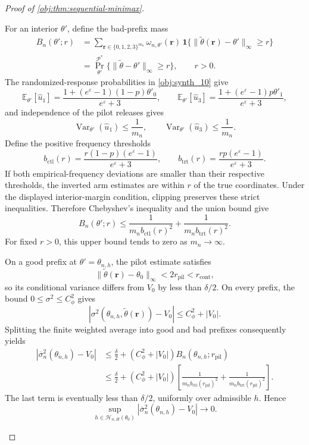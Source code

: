 \documentclass[11pt]{article}
\begin{document}
\begin{proof}[Proof of \cref{obj:thm:sequential-minimax}]
\begin{enumerate}
For an interior \(\theta'\), define the bad-prefix mass
\[
\begin{aligned}
B_n(\theta';r)
&=
\sum_{\mathbf r\in\{0,1,2,3\}^{m_n}}
\omega_{n,\theta'}(\mathbf r)\,
\mathbf1\{
\|\widetilde\theta(\mathbf r)-\theta'\|_\infty\ge r
\}\\
&=
\Pr_{\theta'}^{\mathcal P^*}
\{\|\widetilde\theta-\theta'\|_\infty\ge r\},
\qquad r>0.
\end{aligned}
\]
The randomized-response probabilities in \cref{obj:synth_10} give
\[
\mathbb E_{\theta'}[\widehat u_1]
=
\frac{1+(e^\varepsilon-1)(1-p)\theta'_0}
{e^\varepsilon+3},
\qquad
\mathbb E_{\theta'}[\widehat u_3]
=
\frac{1+(e^\varepsilon-1)p\theta'_1}
{e^\varepsilon+3},
\]
and independence of the pilot releases gives
\[
\operatorname{Var}_{\theta'}(\widehat u_1)\le\frac1{m_n},
\qquad
\operatorname{Var}_{\theta'}(\widehat u_3)\le\frac1{m_n}.
\]
Define the positive frequency thresholds
\[
b_{\mathrm{ctl}}(r)
=
\frac{r(1-p)(e^\varepsilon-1)}{e^\varepsilon+3},
\qquad
b_{\mathrm{trt}}(r)
=
\frac{rp(e^\varepsilon-1)}{e^\varepsilon+3}.
\]
If both empirical-frequency deviations are smaller than their respective thresholds, the inverted arm estimates are within \(r\) of the true coordinates. Under the displayed interior-margin condition, clipping preserves these strict inequalities. Therefore Chebyshev's inequality and the union bound give
\[
B_n(\theta';r)
\le
\frac1{m_n b_{\mathrm{ctl}}(r)^2}
+
\frac1{m_n b_{\mathrm{trt}}(r)^2}.
\]
For fixed \(r>0\), this upper bound tends to zero as \(m_n\to\infty\).

On a good prefix at \(\theta'=\theta_{n,h}\), the pilot estimate satisfies
\[
\|\widetilde\theta(\mathbf r)-\theta_0\|_\infty
<
2r_{\mathrm{pil}}<r_{\mathrm{cont}},
\]
so its conditional variance differs from \(V_0\) by less than \(\delta/2\). On every prefix, the bound \(0\le\sigma^2\le C_\phi^2\) gives
\[
|\sigma^2(\theta_{n,h},\widetilde\theta(\mathbf r))-V_0|
\le C_\phi^2+|V_0|.
\]
Splitting the finite weighted average into good and bad prefixes consequently yields
\[
\begin{aligned}
|\overline\sigma_n^2(\theta_{n,h})-V_0|
&\le
\frac{\delta}{2}
+
(C_\phi^2+|V_0|)B_n(\theta_{n,h};r_{\mathrm{pil}})\\
&\le
\frac{\delta}{2}
+
(C_\phi^2+|V_0|)
\left[
\frac1{m_n b_{\mathrm{ctl}}(r_{\mathrm{pil}})^2}
+
\frac1{m_n b_{\mathrm{trt}}(r_{\mathrm{pil}})^2}
\right].
\end{aligned}
\]
The last term is eventually less than \(\delta/2\), uniformly over admissible \(h\). Hence
\[
\sup_{h\in\mathcal H_{n,H}(\theta_0)}
|\overline\sigma_n^2(\theta_{n,h})-V_0|
\longrightarrow0.
\]


\end{enumerate}
\end{proof}
\end{document}
